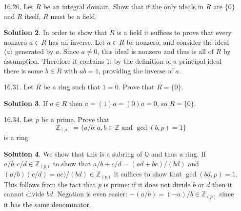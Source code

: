 \documentclass{article}
\newcommand{\QQ}{\mathbb{Q}}
\newcommand{\ZZ}{\mathbb{Z}}
\theoremstyle{definition}
\newtheorem*{solution}{Solution}
\begin{document}
\begin{enumerate}
\begin{solution}
\begin{itemize}
\item Next, we show that this function is injective.  Suppose $S_1$ and $S_2$ are two subrings of $R$ that contain $I$ and that $S_1/I = S_2/I$ inside $R/I$.  We show that $S_1 \subseteq S_2$ (the opposite inclusion is analogous).  Suppose $x \in S_1$.  Since $S_1/I = S_2/I$, there is some $y \in S_2$ with $x + I = y + I$.  Thus there is an $i \in I$ with $x = y + i$.  Since $I \subseteq S_2$, both $y$ and $i$ are in $S_2$ and thus $x$ is as well.
\item Next, suppose that $S$ is actually an ideal of $R$.  To show that $S/I$ is an ideal of $R/I$, we take an arbitrary $s + I \in S/I$ and $x + I \in R/I$.  Then $xs + I \in S/I$ and $sx + I \in S/I$ since $S$ is an ideal of $R$.
\item Finally, suppose that $T \subseteq R/I$ is an ideal.  Let $S = \{x \in R : x + I \in T\}$ as before.  We show that $S$ is an ideal of $R$, proving that the correspondence restricts to a correspondence on ideals.  If $s \in S$ and $x \in R$ then $xs + I = (x+I)(s+I) \in S/I$ since $S/I$ is an ideal; similarly for $sx$.  Thus $S$ is an ideal.
\end{itemize}
\end{solution}
\item[16.26.] Let $R$ be an integral domain. Show that if the only ideals in $R$ are $\{0\}$ and $R$ itself, $R$ must be a field.
\begin{solution}
In order to show that $R$ is a field it suffices to prove that every nonzero $a \in R$ has an inverse.  Let $a \in R$ be nonzero, and consider the ideal $\langle a \rangle$ generated by $a$.  Since $a \ne 0$, this ideal is nonzero and thus is all of $R$ by assumption.  Therefore it contains $1$; by the definition of a principal ideal there is some $b \in R$ with $ab = 1$, providing the inverse of $a$.
\end{solution}
\item[16.31.] Let $R$ be a ring such that $1 = 0$.  Prove that $R = \{0\}$.
\begin{solution}
If $a \in R$ then $a = (1)a = (0)a = 0$, so $R = \{0\}$.
\end{solution}
\item[16.34.] Let $p$ be a prime. Prove that
\[
\ZZ_{(p)} = \{a/b : a, b \in \ZZ \mbox{ and $\gcd(b,p) = 1$}\}
\]
is a ring.
\begin{solution}
We show that this is a subring of $\QQ$ and thus a ring.  If $a/b, c/d \in \ZZ_{(p)}$ to show that $a/b + c/d = (ad + bc)/(bd)$ and $(a/b)(c/d) = ac)/(bd) \in \ZZ_{(p)}$ it suffices to show that $\gcd(bd, p) = 1$.  This follows from the fact that $p$ is prime: if it does not divide $b$ or $d$ then it cannot divide $bd$.  Negation is even easier: $-(a/b) = (-a)/b \in \ZZ_{(p)}$ since it has the same denominator.

\end{solution}
\end{enumerate}
\end{document}
